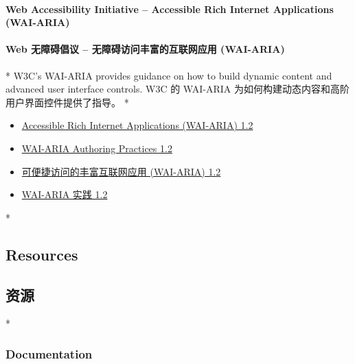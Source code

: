 \begin{paracol}{2}
\paragraph{Web Accessibility Initiative -- Accessible Rich Internet Applications (WAI-ARIA)}
\switchcolumn
\paragraph{Web 无障碍倡议 -- 无障碍访问丰富的互联网应用 (WAI-ARIA)}
\switchcolumn[0]*%
W3C's WAI-ARIA provides guidance on how to build dynamic content and
advanced user interface controls.
\switchcolumn
W3C 的 WAI-ARIA 为如何构建动态内容和高阶用户界面控件提供了指导。
\switchcolumn[0]*%
\begin{itemize}
\item
  \href{https://www.w3.org/TR/wai-aria-1.2/}{Accessible Rich Internet
  Applications (WAI-ARIA) 1.2}
\item
  \href{https://www.w3.org/TR/wai-aria-practices-1.2/}{WAI-ARIA
  Authoring Practices 1.2}
\end{itemize}
\switchcolumn
\begin{itemize}
\item
  \href{https://www.w3.org/TR/wai-aria-1.2/}{可便捷访问的丰富互联网应用
  (WAI-ARIA) 1.2}
\item
  \href{https://www.w3.org/TR/wai-aria-practices-1.2/}{WAI-ARIA 实践
  1.2}
\end{itemize}
\switchcolumn[0]*%
\subsection{Resources}
\switchcolumn
\subsection{资源}
\switchcolumn[0]*%
\subsubsection{Documentation}
\switchcolumn

\end{paracol}
